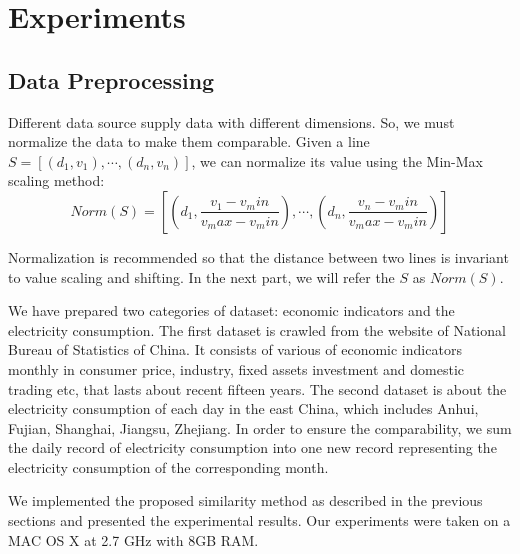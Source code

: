 
\section{Experiments}
\subsection{Data Preprocessing}
Different data source supply data with different dimensions. So, we must normalize the data to make them comparable. 
Given a line $S = [(d_1, v_1), \cdots, (d_n, v_n)]$, we can normalize its value using the Min-Max scaling method:
\begin{equation}
	Norm(S) = [(d_1, \frac{v_1 - v_min}{v_max - v_min}), \cdots, (d_n, \frac{v_n - v_min}{v_max - v_min})]
\end{equation}

Normalization is recommended so that the distance between two lines is invariant to value scaling and shifting. In the next part, we will refer the $S$ as $Norm(S)$. 

We have prepared two categories of dataset: economic indicators and the electricity consumption. The first dataset is crawled from the website of National Bureau of Statistics of China. It consists of various of economic indicators monthly in consumer price, industry, fixed assets investment and domestic trading etc, that lasts about recent fifteen years. The second dataset is about the electricity consumption of each day in the east China, which includes Anhui, Fujian, Shanghai, Jiangsu, Zhejiang. In order to ensure the comparability, we sum the daily record of electricity consumption into one new record representing the electricity consumption of the corresponding month. 

We implemented the proposed similarity method as described in the previous sections and presented the experimental results. Our experiments were taken on a MAC OS X at 2.7 GHz with 8GB RAM.

